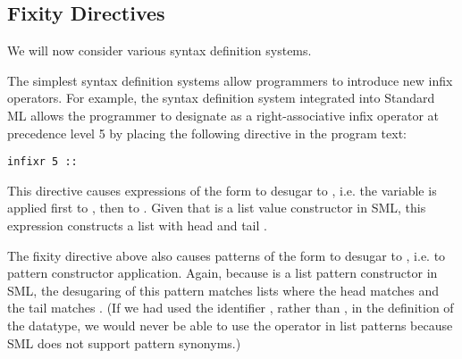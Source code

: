 
\subsection{Fixity Directives}\label{sec:Fixity-directives}
We will now consider various syntax definition systems.

The simplest syntax definition systems allow programmers to introduce new infix operators. For example, the syntax definition system integrated into Standard ML allows the programmer to designate \li{::} as a right-associative infix operator at precedence level 5 by placing the following directive in the program text:
\begin{lstlisting}[numbers=none]
infixr 5 ::
\end{lstlisting}
This directive causes expressions of the form  to desugar to , i.e. the variable  is applied first to , then to . Given that  is a list value constructor in SML, this expression constructs a list with head  and tail .

The fixity directive above also causes patterns of the form  to desugar to , i.e. to pattern constructor application. Again, because  is a list pattern constructor in SML, the desugaring of this pattern matches lists where the head matches  and the tail matches . (If we had used the identifier , rather than , in the definition of the  datatype, we would never be able to use the \li{::} operator in list patterns because SML does not support pattern synonyms.)%

